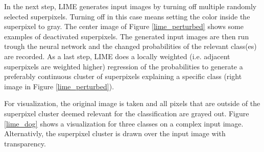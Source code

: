 In the next step, LIME generates input images by turning off multiple randomly selected superpixels. Turning off in this case means setting the color inside the superpixel to gray. The center image of Figure \ref{lime_perturbed} shows some examples of deactivated superpixels. The generated input images are then run trough the neural network and the changed probabilities of the relevant class(es) are recorded. As a last step, LIME does a locally weighted (i.e. adjacent superpixels are weighted higher) regression of the probabilities to generate a preferably continuous cluster of superpixels explaining a specific class (right image in Figure \ref{lime_perturbed}).

For visualization, the original image is taken and all pixels that are outside of the superpixel cluster deemed relevant for the classification are grayed out.
Figure \ref{lime_dog} shows a visualization for three classes on a complex input image. Alternativly, the superpixel cluster is drawn over the input image with transparency.

